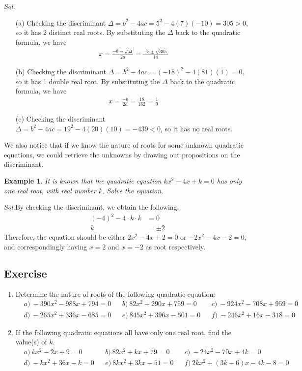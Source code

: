 \documentclass[12pt]{article}
\newtheorem{example}{Example}
\begin{document}
    \textit{ Sol.}\begin{enumerate}
        \item[(a)] Checking the discriminant $\Delta=b^2-4ac=5^2-4(7)(-10)=305>0$, so it has 2 distinct real roots. By substituting the $\Delta$ back to the quadratic formula, we have \begin{align*}
            x=\frac{-b\pm\sqrt{\Delta}}{2a}=\frac{-5\pm\sqrt{305}}{14}
        \end{align*}
        \item[(b)] Checking the discriminant $\Delta=b^2-4ac=(-18)^2-4(81)(1)=0$, so it has 1 double real root. By substituting the $\Delta$ back to the quadratic formula, we have \begin{align*}
            x=\frac{-b}{2a}=\frac{18}{162}=\frac{1}{9}
        \end{align*}
        \item[(c)] Checking the discriminant $\Delta=b^2-4ac=19^2-4(20)(10)=-439<0$, so it has no real roots. 
    \end{enumerate}

    We also notice that if we know the nature of roots for some unknown quadratic equations, we could retrieve the unknowns by drawing out propositions on the discriminant.

    \begin{example}
        It is known that the quadratic equation $kx^2-4x+k=0$ has only one real root, with real number $k$. Solve the equation.
    \end{example}

    \textit{ Sol.}By checking the discriminant, we obtain the following:\begin{align*}
        (-4)^2-4\cdot k\cdot k&=0\\
        k&=\pm 2
    \end{align*}
    \indent \indent Therefore, the equation should be either $2x^2-4x+2=0$ or $-2x^2-4x-2=0$, and correspondingly having $x=2$ and $x=-2$ as root respectively.

    \subsection*{Exercise}
    \begin{enumerate}
        \item Determine the nature of roots of the following quadratic equation:\begin{align*}
            &a)\ -390x^2-988x+794=0&&b)\ 82x^2+290x+759=0&&c)\ -924x^2-708x+959=0\\
            &d)\ -265x^2+336x-685=0&&e)\ 845x^2+396x-501=0&&f)\ -246x^2+16x-318=0
        \end{align*}
        \item If the following quadratic equations all have only one real root, find the value(s) of $k$.\begin{align*}
            &a)\ kx^2-2x+9=0&&b)\ 82x^2+kx+79=0&&c)\ -24x^2-70x+4k=0\\
            &d)\ -kx^2+36x-k=0&&e)\ 8kx^2+3kx-51=0&&f)\ 2kx^2+(3k-6)x-4k-8=0
        \end{align*}
    \end{enumerate}
\end{document}

